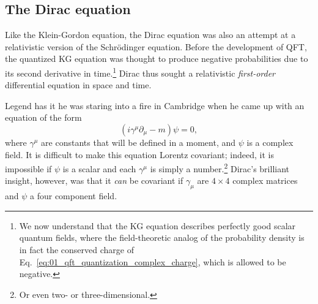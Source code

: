 \subsection{The Dirac equation}
\label{sec:01_qft_spinors_dirac}


Like the Klein-Gordon equation, the Dirac equation was also an attempt at a relativistic version of the Schrödinger equation.
Before the development of QFT, the quantized KG equation was thought to produce negative probabilities due to its second derivative in time.\footnote{We now understand that the KG equation describes perfectly good scalar quantum fields, where the field-theoretic analog of the probability density is in fact the conserved charge of Eq.~\ref{eq:01_qft_quantization_complex_charge}, which is allowed to be negative.}
Dirac thus sought a relativistic \textit{first-order} differential equation in space and time.

Legend has it he was staring into a fire in Cambridge when he came up with an equation of the form
\begin{equation}
	\label{eq:01_qft_spinors_dirac}
	(i\gamma^\mu \partial_\mu - m)\psi = 0,
\end{equation}
where $\gamma^\mu$ are constants that will be defined in a moment, and $\psi$ is a complex field.
It is difficult to make this equation Lorentz covariant; indeed, it is impossible if $\psi$ is a scalar and each $\gamma^\mu$ is simply a number.\footnote{Or even two- or three-dimensional.}
Dirac's brilliant insight, however, was that it \textit{can} be covariant if $\gamma_\mu$ are $4\times 4$ complex matrices and $\psi$ a four component field.

